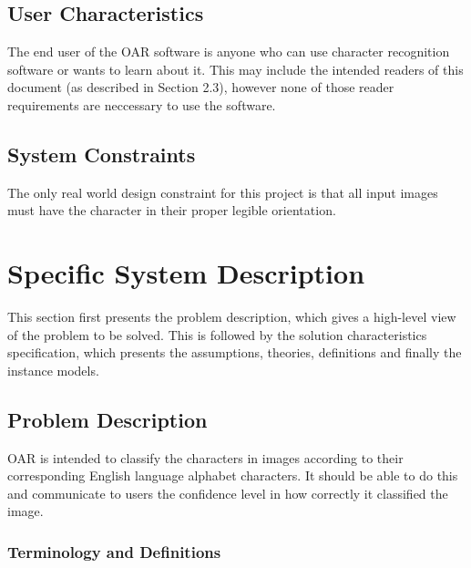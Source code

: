 \documentclass[12pt]{article}
\begin{document}
\subsection{User Characteristics} \label{SecUserCharacteristics}

The end user of the OAR software is anyone who can use character recognition software or wants to learn about it. This may include 
the intended readers of this document (as described in Section 2.3), however none of those reader requirements are neccessary 
to use the software.

\subsection{System Constraints}

The only real world design constraint for this project is that all input images must have the character in their proper legible
orientation.

\section{Specific System Description}

This section first presents the problem description, which gives a high-level
view of the problem to be solved.  This is followed by the solution characteristics
specification, which presents the assumptions, theories, definitions and finally
the instance models.  

\subsection{Problem Description} \label{Sec_pd}

OAR is intended to classify the characters in images according to their corresponding English language
alphabet characters. It should be able to do this and communicate to users the confidence level in how correctly it 
classified the image.

\subsubsection{Terminology and  Definitions}

\end{document}
